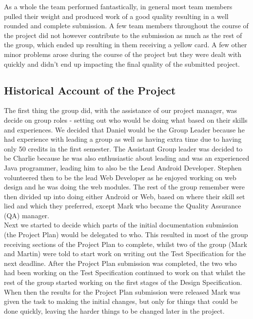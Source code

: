 \documentclass{article}
\begin{document}
		As a whole the team performed fantastically, in general most team members pulled their weight and produced work of a good quality resulting in a well rounded and complete submission. A few team members throughout the course of the project did not however contribute to the submission as much as the rest of the group, which ended up resulting in them receiving a yellow card. A few other minor problems arose during the course of the project but they were dealt with quickly and didn't end up impacting the final quality of the submitted project. \\
		
		\subsection{Historical Account of the Project}
		The first thing the group did, with the assistance of our project manager, was decide on group roles - setting out who would be doing what based on their skills and experiences. We decided that Daniel would be the Group Leader because he had experience with leading a group as well as having extra time due to having only 50 credits in the first semester. The Assistant Group leader was decided to be Charlie because he was also enthusiastic about leading and was an experienced Java programmer, leading him to also be the Lead Android Developer. Stephen volunteered then to be the lead Web Developer as he enjoyed working on web design and he was doing the web modules. The rest of the group remember were then divided up into doing either Android or Web, based on where their skill set lied and which they preferred, except Mark who became the Quality Assurance (QA) manager. \\

		Next we started to decide which parts of the initial documentation submission (the Project Plan) would be delegated to who. This resulted in most of the group receiving sections of the Project Plan to complete, whilst two of the group (Mark and Martin) were told to start work on writing out the Test Specification for the next deadline. After the Project Plan submission was completed, the two who had been working on the Test Specification continued to work on that whilst the rest of the group started working on the first stages of the Design Specification. When then the results for the Project Plan submission were released Mark was given the task to making the initial changes, but only for things that could be done quickly, leaving the harder things to be changed later in the project. \\
\end{document}
